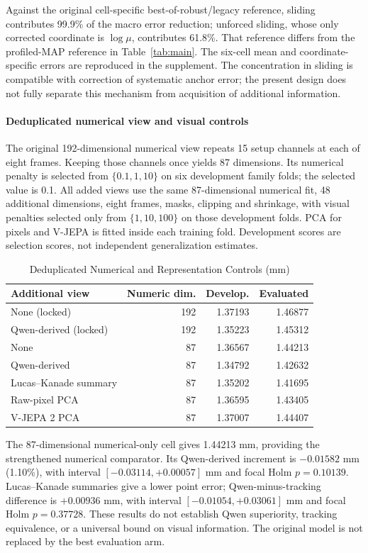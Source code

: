 \documentclass{ieeeaccess}
\begin{document}
Against the original cell-specific best-of-robust/legacy reference, sliding contributes 99.9\% of the macro error reduction; unforced sliding, whose only corrected coordinate is $\log\mu$, contributes 61.8\%. That reference differs from the profiled-MAP reference in Table~\ref{tab:main}. The six-cell mean and coordinate-specific errors are reproduced in the supplement. The concentration in sliding is compatible with correction of systematic anchor error; the present design does not fully separate this mechanism from acquisition of additional information.

\paragraph{Deduplicated numerical view and visual controls}
The original 192-dimensional numerical view repeats 15 setup channels at each of eight frames. Keeping those channels once yields 87 dimensions. Its numerical penalty is selected from $\{0.1,1,10\}$ on six development family folds; the selected value is 0.1. All added views use the same 87-dimensional numerical fit, 48 additional dimensions, eight frames, masks, clipping and shrinkage, with visual penalties selected only from $\{1,10,100\}$ on those development folds. PCA for pixels and V-JEPA is fitted inside each training fold. Development scores are selection scores, not independent generalization estimates.

\begin{table}[t]\centering\small
\setlength{\tabcolsep}{3.5pt}
\caption{Deduplicated Numerical and Representation Controls (mm)}\label{tab:channels}
\begin{tabular}{lrrr}\toprule
Additional view & Numeric dim. & Develop. & Evaluated\\\midrule
None (locked) & 192 & 1.37193 & 1.46877\\
Qwen-derived (locked) & 192 & 1.35223 & 1.45312\\
None & 87 & 1.36567 & 1.44213\\
Qwen-derived & 87 & 1.34792 & 1.42632\\
Lucas--Kanade summary & 87 & 1.35202 & 1.41695\\
Raw-pixel PCA & 87 & 1.36595 & 1.43405\\
V-JEPA 2 PCA & 87 & 1.37007 & 1.44407\\\bottomrule
\end{tabular}
\end{table}

The 87-dimensional numerical-only cell gives 1.44213 mm, providing the strengthened numerical comparator. Its Qwen-derived increment is $-0.01582$ mm (1.10\%), with interval $[-0.03114,+0.00057]$ mm and focal Holm $p=0.10139$. Lucas--Kanade summaries give a lower point error; Qwen-minus-tracking difference is $+0.00936$ mm, with interval $[-0.01054,+0.03061]$ mm and focal Holm $p=0.37728$. These results do not establish Qwen superiority, tracking equivalence, or a universal bound on visual information. The original model is not replaced by the best evaluation arm.
\end{document}
